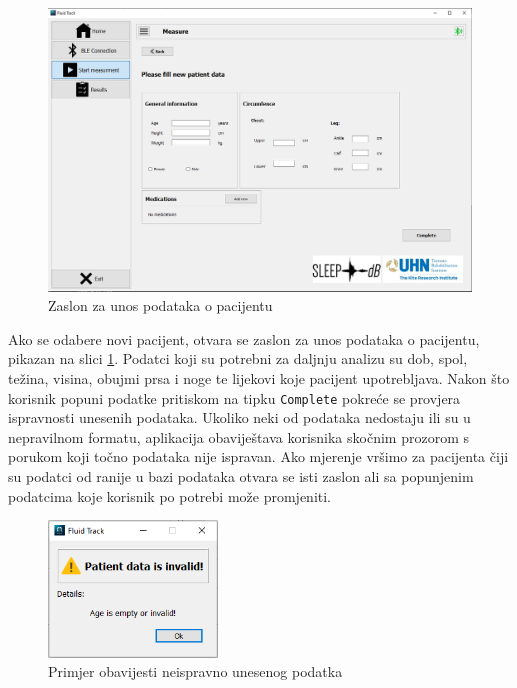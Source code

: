 \documentclass[../diplomski_rad.tex]{subfiles}
\begin{document}
\begin{figure}[htb]
    \centering
    \includegraphics[width=1\textwidth]{Figures/patient.png} 
    \caption{Zaslon za unos podataka o pacijentu}
    \label{slk:patient}
\end{figure}

Ako se odabere novi pacijent, otvara se zaslon za unos podataka o pacijentu, pikazan na slici \ref{slk:patient}. 
Podatci koji su potrebni za daljnju analizu su dob, spol, težina, visina, obujmi prsa i noge te lijekovi koje pacijent upotrebljava. 
Nakon što korisnik popuni podatke pritiskom na tipku \texttt{Complete} pokreće se provjera ispravnosti unesenih podataka. 
Ukoliko neki od podataka nedostaju ili su u nepravilnom formatu, aplikacija obaviještava korisnika skočnim prozorom s 
porukom koji točno podataka nije ispravan. 
Ako mjerenje vršimo za pacijenta čiji su podatci od ranije u bazi podataka otvara se isti zaslon ali sa popunjenim podatcima 
koje korisnik po potrebi može promjeniti.  

\begin{figure}[htb]
    \centering
    \includegraphics[width=0.4\textwidth]{Figures/invalid_data.png} 
    \caption{Primjer obavijesti neispravno unesenog podatka}
    \label{slk:invalid_data}
\end{figure}
\end{document}

